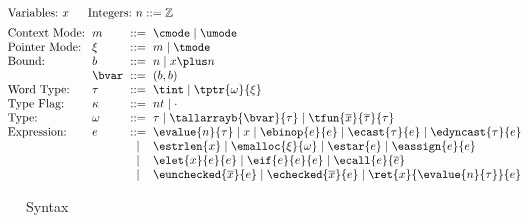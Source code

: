 \begin{figure}
  \small \centering
  \[ \hspace*{-2.2em}
\setlength{\arraycolsep}{3pt}
\begin{array}{l}
\begin{array}{ll}
       \text{Variables:}~ x
&\quad \text{Integers:}~n::=\mathbb{Z} 
\end{array}
\\[0.5em]

\begin{array}{llcllcl}
\text{Context Mode:} & m & ::= & \cmode \mid \umode \\
\text{Pointer Mode:} & \xi & ::= & m \mid \tmode \\
\text{Bound:} & b & ::= & n \mid x \plus n \\
              & \bvar & ::= & (b,b) \\
  
     \text{Word Type:}& \tau &::=& \tint\mid \tptr{\omega}{ \xi}
\\
\text{Type Flag:}&\kappa &::=& nt \mid \cdot
\\
\text{Type:}&\omega &::=& \tau \mid \tallarrayb{\bvar}{\tau} \mid \tfun{\overline{x}}{\overline{\tau}}{\tau}
\\
\text{Expression:}& e & ::= & 
\evalue{n}{\tau} \mid x \mid \ebinop{e}{e}\mid \ecast{\tau}{e} \mid \edyncast{\tau}{e}  \\
&&\mid& \estrlen{x} \mid \emalloc{\xi}{\omega} \mid\estar{e}\mid\eassign{e}{e}  \\
&&\mid& \elet{x}{e}{e} \mid \eif{e}{e}{e} \mid \ecall{e}{\overline{e}}
\\
&&\mid&\eunchecked{\overline{x}}{e}
\mid \echecked{\overline{x}}{e}
\mid \ret{x}{\evalue{n}{\tau}}{e}
\end{array}
    \end{array}
  \]
  \caption{\lang Syntax}
  \label{fig:checkc-syn}
\end{figure}

